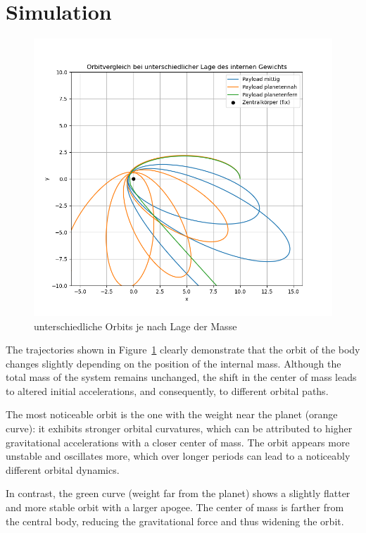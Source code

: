 \documentclass[conference]{IEEEtran}
\begin{document}
\section{Simulation}

\begin{figure}[H]
    \centering
    \includegraphics[width=\linewidth]{pics/orbits.png}
    \caption{unterschiedliche Orbits je nach Lage der Masse}
    \label{fig:orbits}
\end{figure}

The trajectories shown in Figure~\ref{fig:orbits} clearly demonstrate that the orbit of the body changes slightly depending on the position of the internal mass. Although the total mass of the system remains unchanged, the shift in the center of mass leads to altered initial accelerations, and consequently, to different orbital paths.

The most noticeable orbit is the one with the weight near the planet (orange curve): it exhibits stronger orbital curvatures, which can be attributed to higher gravitational accelerations with a closer center of mass. The orbit appears more unstable and oscillates more, which over longer periods can lead to a noticeably different orbital dynamics.

In contrast, the green curve (weight far from the planet) shows a slightly flatter and more stable orbit with a larger apogee. The center of mass is farther from the central body, reducing the gravitational force and thus widening the orbit.
\end{document}
